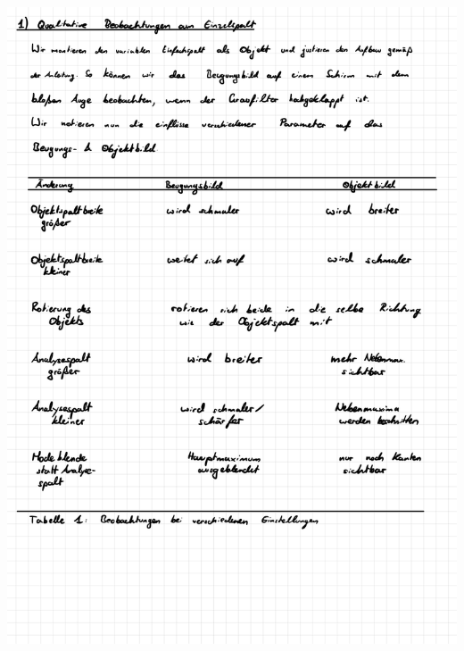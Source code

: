 \documentclass{article}
\begin{document}
\includegraphics[width=\textwidth]{graphics/messprotokoll/233 - Fourieroptik-4.jpg}
\newpage
\end{document}
